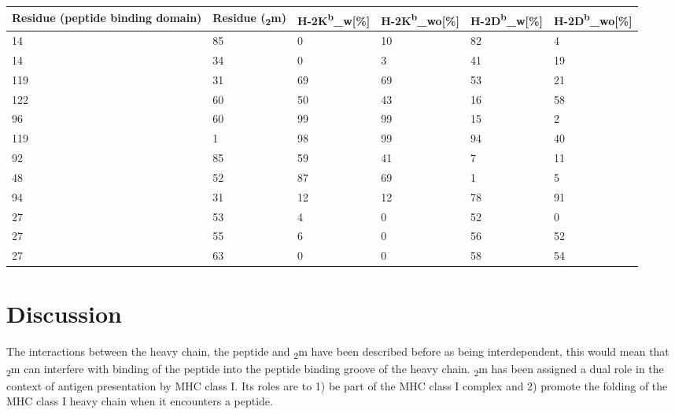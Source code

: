 \documentclass[11pt,twocolumn]{article}
\newcommand{\db}{H-2D\textsuperscript{b}\xspace}
\newcommand{\dbw}{H-2D\textsuperscript{b}\_w\xspace}
\newcommand{\dbwo}{H-2D\textsuperscript{b}\_wo\xspace}
\newcommand{\kb}{H-2K\textsuperscript{b}\xspace}
\newcommand{\kbw}{H-2K\textsuperscript{b}\_w\xspace}
\newcommand{\kbwo}{H-2K\textsuperscript{b}\_wo\xspace}
\newcommand{\angstr}{{\AA}ngstroms\xspace}
\newcommand{\btm}{\textbeta\textsubscript{2}m\xspace}
\begin{document}
\begin{table*}
\caption{\textbf{ Compilation of the the interacting residues used for the analysis of \kb and \db, and the percentage of interactions bellow below four \angstr, of each analysed condition.} The residues interacting coming from the peptide binding domain, the residues interacting coming from \btm and the percentage of their interaction which is below four \angstr is analysed in \db and \kb for the condition of with peptide and without peptide}
\label{KBDBinteractions}
\begin{tabularx}{\linewidth}{|X|X|X|X|X|X|}  \hline
Residue (peptide binding domain)&Residue (\btm)&\kbw [\%]&\kbwo [\%]&\dbw [\%]&\dbwo [\%]\\ \hline
14&85&0&10&82&4\\ \hline
14&34&0&3&41&19\\ \hline
119&31&69&69&53&21\\ \hline
122&60&50&43&16&58\\ \hline
96&60&99&99&15&2\\ \hline
119&1&98&99&94&40\\ \hline
92&85&59&41&7&11\\ \hline
48&52&87&69&1&5\\ \hline
94&31&12&12&78&91\\ \hline
27&53&4&0&52&0\\ \hline
27&55&6&0&56&52\\ \hline
27&63&0&0&58&54\\ \hline
\end{tabularx}
\end{table*}









\section*{Discussion}
The interactions between the heavy chain, the peptide and \btm have been described before as being interdependent, this would mean that \btm can interfere with binding of the peptide into the peptide binding groove of the heavy chain. 
\btm has been assigned a dual role in the context of antigen presentation by MHC class I. Its roles are to 1) be part of the MHC class I complex and 2) promote the folding of the MHC class I heavy chain when it encounters a peptide.
\end{document}

